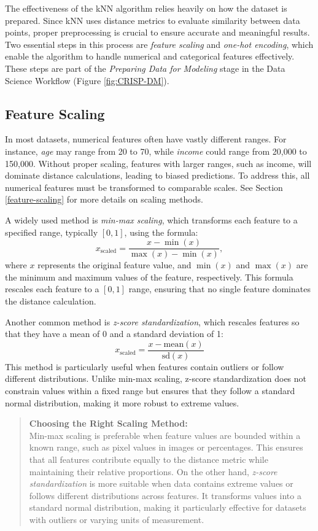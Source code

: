 \documentclass[
  11pt,
]{book}
\renewenvironment{quote}{\begin{quotation}}{\end{quotation}}
\theoremstyle{definition}
\theoremstyle{definition}
\theoremstyle{definition}
\theoremstyle{definition}
\theoremstyle{remark}
\begin{document}
The effectiveness of the kNN algorithm relies heavily on how the dataset is prepared. Since kNN uses distance metrics to evaluate similarity between data points, proper preprocessing is crucial to ensure accurate and meaningful results. Two essential steps in this process are \emph{feature scaling} and \emph{one-hot encoding}, which enable the algorithm to handle numerical and categorical features effectively. These steps are part of the \emph{Preparing Data for Modeling} stage in the Data Science Workflow (Figure \ref{fig:CRISP-DM}).

\subsection{Feature Scaling}\label{feature-scaling-1}

In most datasets, numerical features often have vastly different ranges. For instance, \emph{age} may range from 20 to 70, while \emph{income} could range from 20,000 to 150,000. Without proper scaling, features with larger ranges, such as income, will dominate distance calculations, leading to biased predictions. To address this, all numerical features must be transformed to comparable scales. See Section \ref{feature-scaling} for more details on scaling methods.

A widely used method is \emph{min-max scaling}, which transforms each feature to a specified range, typically \([0, 1]\), using the formula:
\[
x_{\text{scaled}} = \frac{x - \min(x)}{\max(x) - \min(x)},
\]
where \(x\) represents the original feature value, and \(\min(x)\) and \(\max(x)\) are the minimum and maximum values of the feature, respectively. This formula rescales each feature to a \([0,1]\) range, ensuring that no single feature dominates the distance calculation.

Another common method is \emph{z-score standardization}, which rescales features so that they have a mean of 0 and a standard deviation of 1:
\[
x_{\text{scaled}} = \frac{x - \text{mean}(x)}{\text{sd}(x)}
\]
This method is particularly useful when features contain outliers or follow different distributions. Unlike min-max scaling, z-score standardization does not constrain values within a fixed range but ensures that they follow a standard normal distribution, making it more robust to extreme values.

\begin{quote}
\textbf{Choosing the Right Scaling Method:}\\
Min-max scaling is preferable when feature values are bounded within a known range, such as pixel values in images or percentages. This ensures that all features contribute equally to the distance metric while maintaining their relative proportions. On the other hand, \emph{z-score standardization} is more suitable when data contains extreme values or follows different distributions across features. It transforms values into a standard normal distribution, making it particularly effective for datasets with outliers or varying units of measurement.
\end{quote}
\end{document}
